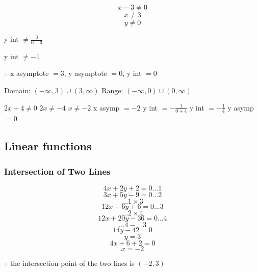 \documentclass{report}
\begin{document}
$$x-3 \neq 0$$
$$x \neq 3$$
$$y \neq 0$$
\begin{center} y int $\neq\frac{3}{0-3}$\end{center}
\begin{center} y int $\neq-1$\end{center}
\begin{center}
    $\therefore$ x asymptote $= 3$, y asymptote $= 0$, y int $= 0$
\end{center}
\begin{center}   
    Domain:
    \newline
    $(-\infty, 3)\cup(3,\infty) $
    \newline
    Range:
    \newline
    $(-\infty,0)\cup(0,\infty)$
\end{center}
\newpage
{}
\begin{center}
    $2x+4 \neq 0$
    \newline
    $2x \neq -4$
    \newline
    $x \neq -2$
    \newline
    x asymp $= -2$
    \newline
    y int $= -\frac{1}{0+4}$
    \newline
    y int $= -\frac{1}{4}$
    \newline
    y asymp $= 0$

\end{center}


\subsection{Linear functions}
\subsubsection{Intersection of Two Lines}
$$4x+2y+2=0...1$$
$$3x+5y-9=0...2$$
$$...1 \times 3$$
$$12x+6y+6 = 0...3$$
$$...2 \times 4$$
$$12x+20y-36=0...4$$
$$...4 - ...3$$
$$14y - 42 = 0$$
$$y = 3$$
$$4x+6+2 = 0$$
$$x = -2$$
\begin{center}
    $\therefore$ the intersection point of the two lines is $(-2,3)$
\end{center}
\end{document}
